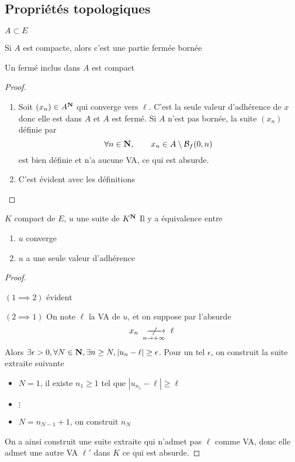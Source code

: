 \subsection{Propriétés topologiques}

\begin{prop}
\Hyp $A\subset E$
 \begin{concenum}
 \item Si  $A$ est compacte, alors c'est une partie fermée bornée
 \item Un fermé inclus dans  $A$ est compact
\end{concenum}
\end{prop}

\begin{proof}
\begin{enumerate}
    \item Soit $(x_n)\in A^{\mathbf N}$ qui converge vers $\ell$. C'est la seule valeur d'adhérence de  $x$ donc elle est dans  $A$ et $A$ est fermé. Si  $A$ n'est pas bornée, la suite  $(x_n)$ définie par  \[
            \forall  n \in  \mathbf N,\qquad  x_n \in  A\setminus    \mathcal  B_f(0,n)
    \] 
    est bien définie et n'a aucune VA, ce qui est absurde.
\item C'est évident avec les définitions
\end{enumerate}
\end{proof}

\begin{prop}
\Hyp $K$ compact de $E$,  $u$ une suite de  $K^{\mathbf N}$ 
\Conc Il y a équivalence entre \begin{enumerate}
    \item $u$ converge
    \item  $u$ a une seule valeur d'adhérence
\end{enumerate}
\end{prop}

\begin{proof} ~

    $(1\implies 2)$ évident

    $(2\implies 1)$ On note $\ell$ la VA de  $u$, et on suppose par l'absurde  \[
        x_n \xnrightarrow[n\to+\infty]{}\ell
    \]
    Alors $\exists \epsilon>0,\forall  N \in  \mathbf N,\exists  n\geq N, |u_n-\ell|\geq \epsilon$. Pour un tel $\epsilon$, on construit la suite extraite suivante \begin{itemize}
        \item $N=1$, il existe  $n_1\geq 1$ tel que $|u_{n_1}-\ell|\geq \ell$
        \item $\vdots$
        \item  $N=n_{N-1}+1$, on construit $n_N$
    \end{itemize}
    On a ainsi construit une suite extraite qui n'admet pas $\ell$ comme VA, donc elle admet une autre VA  $\ell'$ dans  $K$ ce qui est absurde.
\end{proof}


